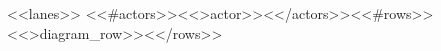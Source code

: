 \par\medskip
\begin{vpdiagram}{<<lanes>>}
<<#actors>><<>actor>><</actors>><<#rows>><<>diagram_row>><</rows>>\end{vpdiagram}
\label{fig:<<figid>>}
\par\medskip
